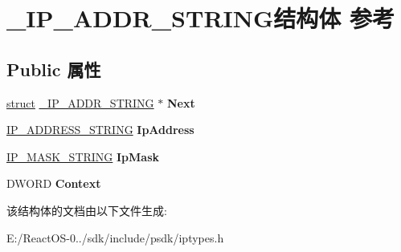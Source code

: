 \hypertarget{struct___i_p___a_d_d_r___s_t_r_i_n_g}{}\section{\+\_\+\+I\+P\+\_\+\+A\+D\+D\+R\+\_\+\+S\+T\+R\+I\+N\+G结构体 参考}
\label{struct___i_p___a_d_d_r___s_t_r_i_n_g}
\subsection*{Public 属性}
\begin{DoxyCompactItemize}
\item 
\mbox{\label{struct___i_p___a_d_d_r___s_t_r_i_n_g_a3b6b58c7b566ee99cf9bb1d9c72d3b81}} 
\hyperlink{interfacestruct}{struct} \hyperlink{struct___i_p___a_d_d_r___s_t_r_i_n_g}{\+\_\+\+I\+P\+\_\+\+A\+D\+D\+R\+\_\+\+S\+T\+R\+I\+NG} $\ast$ {\bfseries Next}
\item 
\mbox{\label{struct___i_p___a_d_d_r___s_t_r_i_n_g_a8b85be40ec914e29ed476996d8ea8283}} 
\hyperlink{struct_i_p___a_d_d_r_e_s_s___s_t_r_i_n_g}{I\+P\+\_\+\+A\+D\+D\+R\+E\+S\+S\+\_\+\+S\+T\+R\+I\+NG} {\bfseries Ip\+Address}
\item 
\mbox{\label{struct___i_p___a_d_d_r___s_t_r_i_n_g_ad8575b32176481ba971aa988d823ec52}} 
\hyperlink{struct_i_p___a_d_d_r_e_s_s___s_t_r_i_n_g}{I\+P\+\_\+\+M\+A\+S\+K\+\_\+\+S\+T\+R\+I\+NG} {\bfseries Ip\+Mask}
\item 
\mbox{\label{struct___i_p___a_d_d_r___s_t_r_i_n_g_ae1b1310460bcb9659dfcd0a2c22decbc}} 
D\+W\+O\+RD {\bfseries Context}
\end{DoxyCompactItemize}


该结构体的文档由以下文件生成\+:\begin{DoxyCompactItemize}
\item 
E\+:/\+React\+O\+S-\/0../sdk/include/psdk/iptypes.\+h\end{DoxyCompactItemize}
